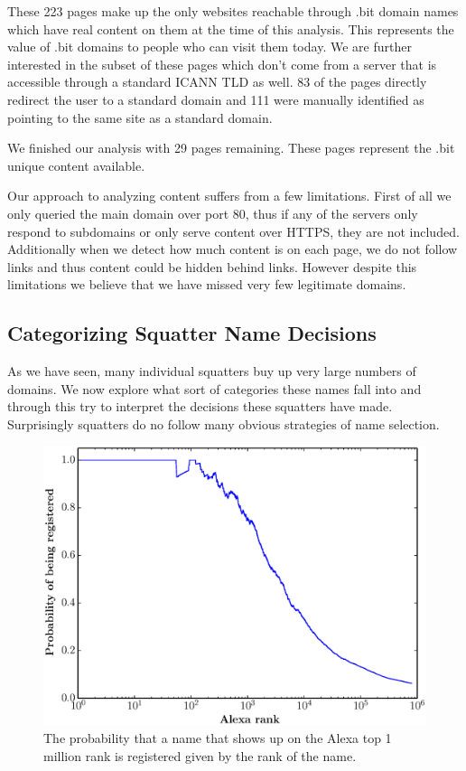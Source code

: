 These 223 pages make up the only websites reachable through .bit domain names which have real content on them at the time of this analysis. This represents the value of .bit domains to people who can visit them today. We are further interested in the subset of these pages which don't come from a server that is accessible through a standard ICANN TLD as well.  83 of the pages directly redirect the user to a standard domain and 111 were manually identified as pointing to the same site as a standard domain.

We finished our analysis with 29 pages remaining. These pages represent the .bit unique content available.

Our approach to analyzing content suffers from a few limitations. First of all we only queried the main domain over port 80, thus if any of the servers only respond to subdomains or only serve content over HTTPS, they are not included. Additionally when we detect how much content is on each page, we do not follow links and thus content could be hidden behind links. However despite this limitations we believe that we have missed very few legitimate domains.

\subsection{Categorizing Squatter Name Decisions}

As we have seen, many individual squatters buy up very large numbers of domains. We now explore what sort of categories these names fall into and through this try to interpret the decisions these squatters have made. Surprisingly squatters do no follow many obvious strategies of name selection.

\begin{figure}
  \centering
  \includegraphics[width=\columnwidth]{figures/alexa_probability}
  \caption{The probability that a name that shows up on the Alexa top 1 million rank is registered given by the rank of the name.}
  \label{fig:alexa_probability}
\end{figure}

